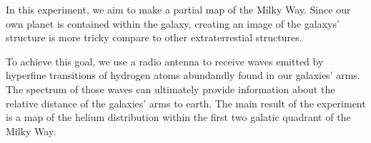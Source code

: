\documentclass[../main.tex]{subfiles}
\begin{document}

In this experiment, we aim to make a partial map of the Milky Way. Since our own planet is contained within the galaxy, creating an image of the galaxys' structure is more tricky compare to other extraterrestial structures.

To achieve this goal, we use a radio antenna to receive waves emitted by hyperfine transitions of hydrogen atoms abundandly found in our galaxies' arms. The spectrum of those waves can ultimately provide information about the relative distance of the galaxies'  
arms to earth. The main result of the experiment is a map of the helium distribution within the first two galatic quadrant of the Milky Way.
\end{document}
